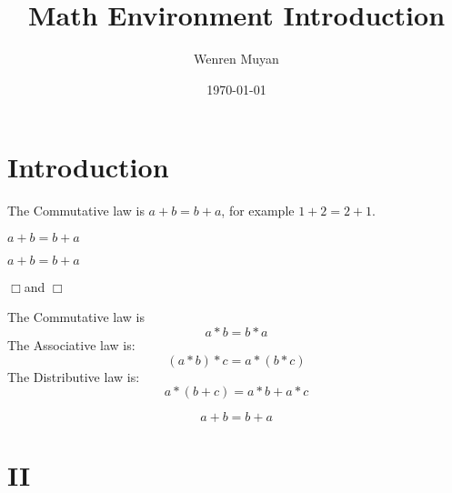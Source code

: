 \documentclass{article}
\title{Math Environment Introduction}
\author{Wenren Muyan}
\date{\today}
\renewcommand\qedsymbol{\ensuremath{\Box}}
\begin{document}
    \maketitle
    \tableofcontents

    \section{Introduction}
        The Commutative law is $a+b=b+a$, for example $1+2=2+1$. \par
        \(a+b=b+a\)\par
        \begin{math}a+b=b+a\end{math}

        \qedsymbol and $\qedsymbol$

        The Commutative law is
        $$
            a*b=b*a
        $$
        The Associative law is:
        \[
            (a*b)*c=a*(b*c)
        \]
        The Distributive law is:
        \begin{displaymath}
            a*(b+c)=a*b+a*c
        \end{displaymath}

        \begin{equation}
            a+b=b+a \label{eq:commutative}
        \end{equation}

    \section{II}
\end{document}
